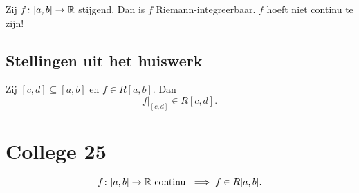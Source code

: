 \documentclass{2wa40summary}
\begin{document}
			\begin{theorem}[\text{[K] 6.2.2}]
				Zij $ f\colon [a,b] \to \mathbb{R} $ stijgend. Dan is $f$ Riemann-integreerbaar.
				\opm $f$ hoeft niet continu te zijn!
			\end{theorem}
			
		\subsection{Stellingen uit het huiswerk}
			\begin{theorem}
				Zij $ [c,d] \subseteq [a,b] $ en $ f \in R[a,b] $. Dan 
				\[ 
					f|_{[c,d]} \in R[c,d].
				 \]
			\end{theorem}
			
		\newpage
		\section{College 25}
			\begin{theorem}[\text{[K]} 6.2.3]
				\[ 
					f\colon [a,b] \to \mathbb{R} \text{ continu } \implies f \in R[a,b].
				 \]
			\end{theorem}
\end{document}
